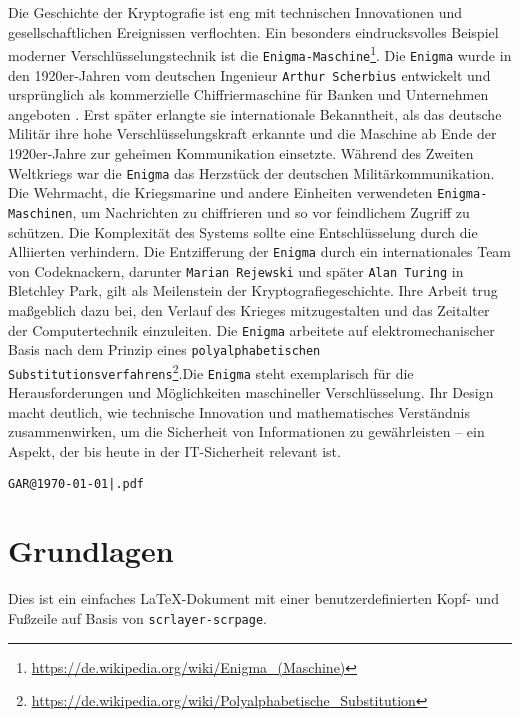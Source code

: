 \documentclass[a4paper,12pt]{scrartcl}
\begin{document}
Die Geschichte der Kryptografie ist eng mit technischen Innovationen und gesellschaftlichen Ereignissen verflochten. Ein besonders eindrucksvolles Beispiel moderner Verschlüsselungstechnik ist die \texttt{Enigma-Maschine}\footnote{\url{https://de.wikipedia.org/wiki/Enigma_(Maschine)}}. Die \texttt{Enigma} wurde in den 1920er-Jahren vom deutschen Ingenieur \texttt{Arthur Scherbius} entwickelt und ursprünglich als kommerzielle Chiffriermaschine für Banken und Unternehmen angeboten \parencite{copeland2017}. Erst später erlangte sie internationale Bekanntheit, als das deutsche Militär ihre hohe Verschlüsselungskraft erkannte und die Maschine ab Ende der 1920er-Jahre zur geheimen Kommunikation einsetzte. Während des Zweiten Weltkriegs war die \texttt{Enigma} das Herzstück der deutschen Militärkommunikation. Die Wehrmacht, die Kriegsmarine und andere Einheiten verwendeten \texttt{Enigma-Maschinen}, um Nachrichten zu chiffrieren und so vor feindlichem Zugriff zu schützen. Die Komplexität des Systems sollte eine Entschlüsselung durch die Alliierten verhindern. Die Entzifferung der \texttt{Enigma} durch ein internationales Team von Codeknackern, darunter \texttt{Marian Rejewski} und später \texttt{Alan Turing} in Bletchley Park, gilt als Meilenstein der Kryptografiegeschichte. Ihre Arbeit trug maßgeblich dazu bei, den Verlauf des Krieges mitzugestalten und das Zeitalter der Computertechnik einzuleiten. Die \texttt{Enigma} arbeitete auf elektromechanischer Basis nach dem Prinzip eines \texttt{polyalphabetischen Substitutionsverfahrens}\footnote{\url{https://de.wikipedia.org/wiki/Polyalphabetische_Substitution}}.Die \texttt{Enigma} steht exemplarisch für die Herausforderungen und Möglichkeiten maschineller Verschlüsselung. Ihr Design macht deutlich, wie technische Innovation und mathematisches Verständnis zusammenwirken, um die Sicherheit von Informationen zu gewährleisten – ein Aspekt, der bis heute in der IT-Sicherheit relevant ist.

\thispagestyle{empty}
\newpage

\iftableofcontentspage
  \tableofcontents

  \thispagestyle{empty}
  \newpage
\fi

\setcounter{page}{1}

\noindent\hfill\texttt{GAR@\today|\jobname.pdf}
\vspace{-25pt}

\section{Grundlagen}
Dies ist ein einfaches LaTeX-Dokument mit einer benutzerdefinierten Kopf- und Fußzeile auf Basis von \texttt{scrlayer-scrpage}.
\end{document}

